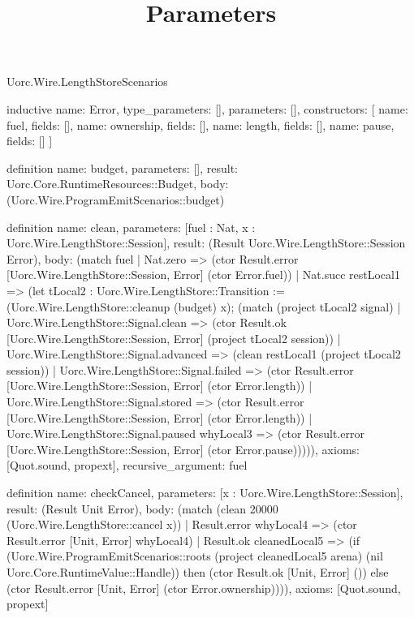 \begin{lexlean}{Uorc.Wire.LengthStoreScenarios}
\title{Parameters}
\begin{semanticmodule}
inductive{
  name: Error,
  type_parameters: [],
  parameters: [],
  constructors: [
    {name: fuel, fields: []},
    {name: ownership, fields: []},
    {name: length, fields: []},
    {name: pause, fields: []}
  ]
}

definition{
  name: budget,
  parameters: [],
  result: Uorc.Core.RuntimeResources::Budget,
  body: (Uorc.Wire.ProgramEmitScenarios::budget)
}

definition{
  name: clean,
  parameters: [fuel : Nat, x : Uorc.Wire.LengthStore::Session],
  result: (Result Uorc.Wire.LengthStore::Session Error),
  body: (match fuel
    | Nat.zero => (ctor Result.error [Uorc.Wire.LengthStore::Session, Error] (ctor Error.fuel))
    | Nat.succ restLocal1 => (let tLocal2 : Uorc.Wire.LengthStore::Transition := (Uorc.Wire.LengthStore::cleanup (budget) x); (match (project tLocal2 signal)
      | Uorc.Wire.LengthStore::Signal.clean => (ctor Result.ok [Uorc.Wire.LengthStore::Session, Error] (project tLocal2 session))
      | Uorc.Wire.LengthStore::Signal.advanced => (clean restLocal1 (project tLocal2 session))
      | Uorc.Wire.LengthStore::Signal.failed => (ctor Result.error [Uorc.Wire.LengthStore::Session, Error] (ctor Error.length))
      | Uorc.Wire.LengthStore::Signal.stored => (ctor Result.error [Uorc.Wire.LengthStore::Session, Error] (ctor Error.length))
      | Uorc.Wire.LengthStore::Signal.paused whyLocal3 => (ctor Result.error [Uorc.Wire.LengthStore::Session, Error] (ctor Error.pause))))),
  axioms: [Quot.sound, propext],
  recursive_argument: fuel
}

definition{
  name: checkCancel,
  parameters: [x : Uorc.Wire.LengthStore::Session],
  result: (Result Unit Error),
  body: (match (clean 20000 (Uorc.Wire.LengthStore::cancel x))
    | Result.error whyLocal4 => (ctor Result.error [Unit, Error] whyLocal4)
    | Result.ok cleanedLocal5 => (if (Uorc.Wire.ProgramEmitScenarios::roots (project cleanedLocal5 arena) (nil Uorc.Core.RuntimeValue::Handle)) then (ctor Result.ok [Unit, Error] ()) else (ctor Result.error [Unit, Error] (ctor Error.ownership)))),
  axioms: [Quot.sound, propext]
}


\end{semanticmodule}
\end{lexlean}
